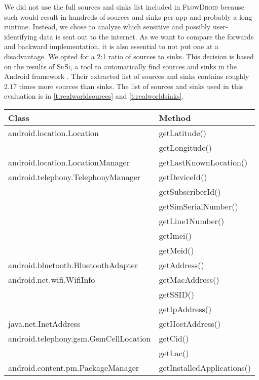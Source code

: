 \documentclass[../draft.tex]{subfiles}
\begin{document}
    We did not use the full sources and sinks list included in \textsc{FlowDroid} because such would result in hundreds of sources and sinks per app and probably a long runtime. Instead, we chose to analyze which sensitive and possibly user-identifying data is sent out to the internet. As we want to compare the forwards and backward implementation, it is also essential to not put one at a disadvantage. We opted for a 2:1 ratio of sources to sinks. This decision is based on the results of \textsc{SuSi}, a tool to automatically find sources and sinks in the Android framework \cite{Rasthofer2014}. Their extracted list of sources and sinks contains roughly $2.17$ times more sources than sinks.
    The list of sources and sinks used in this evaluation is in \autoref{t:realworldsources} and \autoref{t:realworldsinks}.

    \begin{table}[ht]
        \centering
        \begin{tabular}{l | l}
            \textbf{Class} & \textbf{Method}\\
            \hline\hline
            android.location.Location & getLatitude()\\
            & getLongitude()\\
            \hline
            android.location.LocationManager & getLastKnownLocation()\\
            \hline
            android.telephony.TelephonyManager & getDeviceId()\\
            & getSubscriberId()\\
            & getSimSerialNumber()\\
            & getLine1Number()\\
            & getImei()\\
            & getMeid()\\
            \hline
            android.bluetooth.BluetoothAdapter & getAddress()\\
            android.net.wifi.WifiInfo & getMacAddress()\\
            & getSSID()\\
            & getIpAddress()\\
            \hline
            java.net.InetAddress & getHostAddress()\\
            \hline
            android.telephony.gsm.GsmCellLocation & getCid()\\
            & getLac()\\
            \hline
            android.content.pm.PackageManager & getInstalledApplications()\\

\end{tabular}
\end{table}
\end{document}
